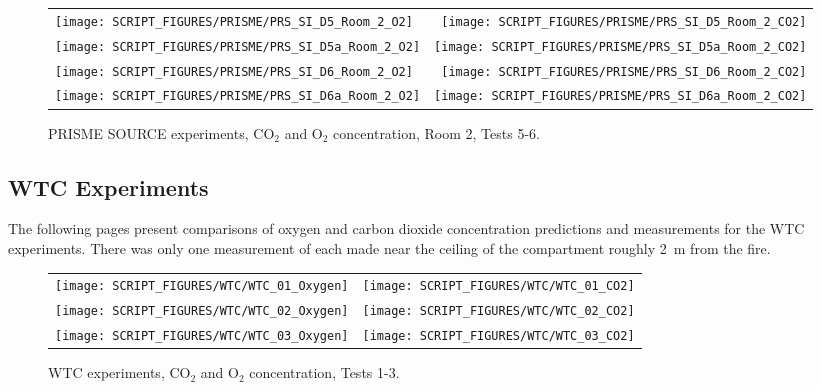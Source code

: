\begin{figure}[p]
\begin{tabular*}{\textwidth}{l@{\extracolsep{\fill}}r}
\texttt{[image: SCRIPT\_FIGURES/PRISME/PRS\_SI\_D5\_Room\_2\_O2]} &
\texttt{[image: SCRIPT\_FIGURES/PRISME/PRS\_SI\_D5\_Room\_2\_CO2]} \\
\texttt{[image: SCRIPT\_FIGURES/PRISME/PRS\_SI\_D5a\_Room\_2\_O2]} &
\texttt{[image: SCRIPT\_FIGURES/PRISME/PRS\_SI\_D5a\_Room\_2\_CO2]} \\
\texttt{[image: SCRIPT\_FIGURES/PRISME/PRS\_SI\_D6\_Room\_2\_O2]} &
\texttt{[image: SCRIPT\_FIGURES/PRISME/PRS\_SI\_D6\_Room\_2\_CO2]} \\
\texttt{[image: SCRIPT\_FIGURES/PRISME/PRS\_SI\_D6a\_Room\_2\_O2]} &
\texttt{[image: SCRIPT\_FIGURES/PRISME/PRS\_SI\_D6a\_Room\_2\_CO2]}
\end{tabular*}
\caption[PRISME SOURCE experiments, CO$_2$ and O$_2$ concentration, Room 2, Tests 5-6]{PRISME SOURCE experiments, CO$_2$ and O$_2$ concentration, Room 2, Tests 5-6.}
\label{PRISME_SOURCE_Gas_2}
\end{figure}

\clearpage


\subsection{WTC Experiments}

The following pages present comparisons of oxygen and carbon dioxide concentration predictions and measurements for the
WTC experiments. There was only one measurement of each made near the ceiling of the compartment roughly 2~m from the fire.


\begin{figure}[h]
\begin{tabular*}{\textwidth}{l@{\extracolsep{\fill}}r}
\texttt{[image: SCRIPT\_FIGURES/WTC/WTC\_01\_Oxygen]} &
\texttt{[image: SCRIPT\_FIGURES/WTC/WTC\_01\_CO2]} \\
\texttt{[image: SCRIPT\_FIGURES/WTC/WTC\_02\_Oxygen]} &
\texttt{[image: SCRIPT\_FIGURES/WTC/WTC\_02\_CO2]} \\
\texttt{[image: SCRIPT\_FIGURES/WTC/WTC\_03\_Oxygen]} &
\texttt{[image: SCRIPT\_FIGURES/WTC/WTC\_03\_CO2]}
\end{tabular*}
\caption[WTC experiments, CO$_2$ and O$_2$ concentration, Tests 1-3]{WTC experiments, CO$_2$ and O$_2$ concentration, Tests 1-3.}
\label{NIST_WTC_Oxygen_CO2_1}
\end{figure}

